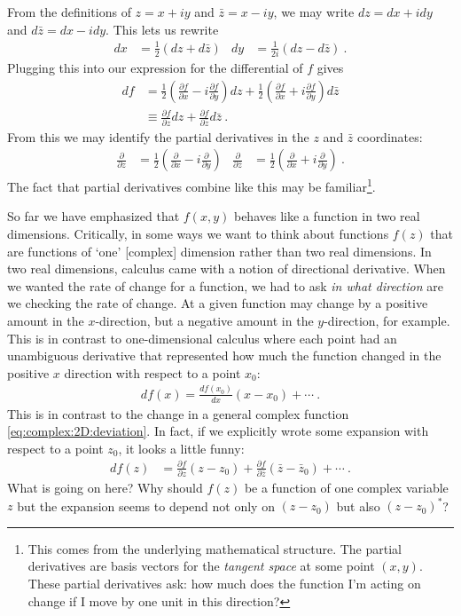 \documentclass[
  11pt,
	colorful,
	raggedright,
]{tufte-style-thesis-flip}
\begin{document}
From the definitions of $z=x+iy$ and $\bar z = x-iy$, we may write $dz = dx+idy$ and $d\bar z = dx-idy$. This lets us rewrite
\begin{align}
  dx &= \frac{1}{2}(dz+d\bar z)
  &
  dy &= \frac{1}{2i}(dz-d\bar z) \ .
\end{align}
Plugging this into our expression for the differential of $f$ gives
\begin{align}
  df &= \frac{1}{2}
  \left(
    \frac{\partial f}{\partial x}
    -i\frac{\partial f}{\partial y}
  \right)dz
  + 
  \frac{1}{2}
  \left(
    \frac{\partial f}{\partial x}
    +i\frac{\partial f}{\partial y}
  \right)d\bar z 
  \\
  &\equiv \frac{\partial f}{\partial z}dz
  + \frac{\partial f}{\partial \bar z}d\bar z
  \label{eq:complex:2D:deviation}
  \ .
\end{align}
From this we may identify the partial derivatives in the $z$ and $\bar z$ coordinates:
\begin{align}
  \frac{\partial}{\partial z} &= 
  \frac{1}{2}
  \left(
  \frac{\partial}{\partial x}
  -i
  \frac{\partial}{\partial y}
  \right)
  &
  \frac{\partial}{\partial \bar z} &= 
  \frac{1}{2}
  \left(
  \frac{\partial}{\partial x}
  +i
  \frac{\partial}{\partial y}
  \right) 
  \ .
  \label{eq:ddz:ddzst}
\end{align}
The fact that partial derivatives combine like this may be familiar\footnote{This comes from the underlying mathematical structure. The partial derivatives are basis vectors for the \emph{tangent space} at some point $(x,y)$. These partial derivatives ask: how much does the function I'm acting on change if I move by one unit in this direction?}. 

So far we have emphasized that $f(x,y)$ behaves like a function in two real dimensions. Critically, in some ways we want to think about functions $f(z)$ that are functions of `one' [complex] dimension rather than two real dimensions. In two real dimensions, calculus came with a notion of directional derivative. When we wanted the rate of change for a function, we had to ask \emph{in what direction} are we checking the rate of change. At a given function may change by a positive amount in the $x$-direction, but a negative amount in the $y$-direction, for example. This is in contrast to one-dimensional calculus where each point had an unambiguous derivative that represented how much the function changed in the positive $x$ direction with respect to a point $x_0$:
\begin{align}
  df(x) = \frac{d f(x_0)}{d x} (x-x_0) + \cdots \ .
\end{align}
This is in contrast to the change in a general complex function \eqref{eq:complex:2D:deviation}. In fact, if we explicitly wrote some expansion with respect to a point $z_0$, it looks a little funny:
\begin{align}
  df(z) &= 
  \frac{\partial f}{\partial z}(z-z_0) +
  \frac{\partial f}{\partial \bar z}(\bar z-\bar z_0) + \cdots \ .
\end{align}
What is going on here? Why should $f(z)$ be a function of one complex variable $z$ but the expansion seems to depend not only on $(z-z_0)$ but also $(z-z_0)^*$? 
\end{document}
